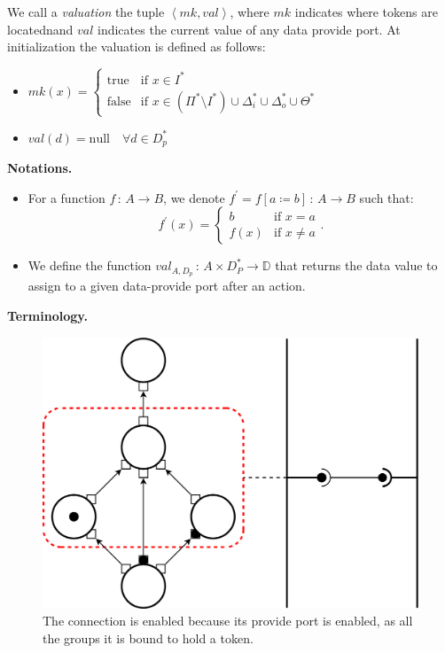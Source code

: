 We call a \emph{valuation} the tuple $\left\langle mk,val\right\rangle$,
where $mk$ indicates where tokens are locatednand $val$ indicates the
current value of any data provide port.
At initialization the valuation is defined as follows:
\begin{itemize}
\item $mk\left(x\right)=\begin{cases}
\text{true} & \text{if }x\in I^{*}\\
\text{false} & \text{if } x\in\left(\Pi^{*}\setminus I^*\right)\cup\Delta_{i}^{*}\cup\Delta_{o}^{*}\cup\Theta^{*}
\end{cases}$
\item $val\left(d\right)=\text{null}\quad\forall d \in D^*_{p}$
\end{itemize}

\noindent\textbf{Notations.}
\begin{itemize}
  \item For a function $f\,:\,A\rightarrow B$, we denote $f^{\prime}=f\left[a\coloneqq b\right]\,:\,A\rightarrow B$ such that:
    \begin{equation*}
      f^{\prime}\left(x\right)=\begin{cases}
      b & \text{if }x=a\\
      f\left(x\right) & \text{if }x\neq a
      \end{cases}.
    \end{equation*}
  \item We define the function $val_{A,D_p}\,:\,A\times
    D_{P}^*\rightarrow \mathbb{D}$ that returns the data value to assign to a
    given data-provide port after an action.
\end{itemize}

\noindent\textbf{Terminology.}

\begin{figure}[t]
  \begin{center}
    \includegraphics[width=0.7\columnwidth]{./images/enabled_service.pdf}

    \caption{The connection is enabled because its provide port is enabled, as all the groups it is bound to hold a token.}

    \label{fig:enabled_service}
  \end{center}
\end{figure}

